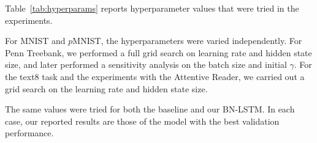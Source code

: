 \documentclass{article} \pdfoutput=1 \usepackage[utf8]{inputenc}
\begin{document}
Table~\ref{tab:hyperparams} reports hyperparameter values that were tried in the experiments.

\begin{table}[!hb]


  \caption{Hyperparameter values that have been explored in the experiments.}
  \label{tab:hyperparams}

\end{table}

For MNIST and $p$MNIST, the hyperparameters were varied independently.
For Penn Treebank, we performed a full grid search on learning rate and hidden state size, and later performed a sensitivity analysis on the batch size and initial $\gamma$.
For the text8 task and the experiments with the Attentive Reader, we carried out a grid search on the learning rate and hidden state size.

The same values were tried for both the baseline and our BN-LSTM.
In each case, our reported results are those of the model with the best validation performance.
\end{document}
